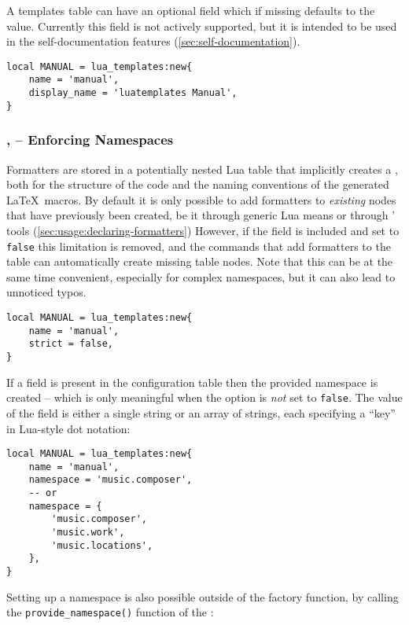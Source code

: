 \documentclass[12pt]{scrartcl}
\begin{document}
A templates table can have an optional field  which if
missing defaults to the  value.  Currently this field is not
actively supported, but it is intended to be used in the self-documentation
features (\vref{sec:self-documentation}).

\begin{verbatim}
local MANUAL = lua_templates:new{
	name = 'manual',
	display_name = 'luatemplates Manual',
}
\end{verbatim}

\subsubsection[Enforcing Namespaces]{,  -- Enforcing Namespaces}

Formatters are stored in a potentially nested Lua table that implicitly creates
a , both for the structure of the code and the naming
conventions of the generated \LaTeX\ macros. By default it is only possible to
add formatters to \emph{existing} nodes that have previously been created, be it
through generic Lua means or through \luatemplates' tools
(\vref{sec:usage:declaring-formatters})  However, if the  field
is included and set to \texttt{false} this limitation is removed, and the
commands that add formatters to the table can automatically create missing table
nodes. Note that this can be at the same time convenient, especially for complex
namespaces, but it can also lead to unnoticed typos.

\begin{verbatim}
local MANUAL = lua_templates:new{
	name = 'manual',
	strict = false,
}
\end{verbatim}

\noindent If a  field is present in the configuration table
then the provided namespace is created -- which is only meaningful when the
 option is \emph{not} set to \texttt{false}.  The value of the
field is either a single string or an array of strings, each specifying a “key”
in Lua-style dot notation:

\begin{verbatim}
local MANUAL = lua_templates:new{
	name = 'manual',
	namespace = 'music.composer',
	-- or
	namespace = {
		'music.composer',
		'music.work',
		'music.locations',
	},
}
\end{verbatim}

\noindent Setting up a namespace is also possible outside of the factory function, by calling the \texttt{provide_namespace()} function of the :
\end{document}
